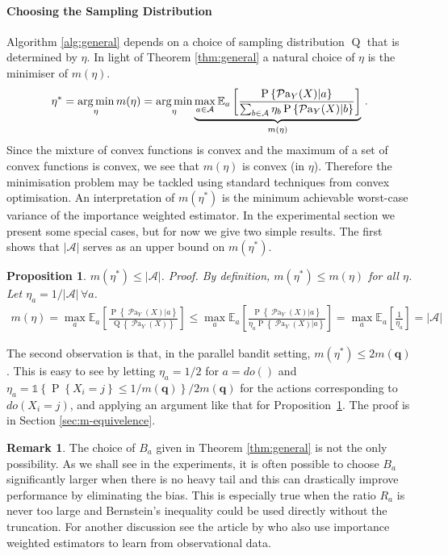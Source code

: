 \documentclass{article}
\newif\ifsup\suptrue
\newcommand{\set}[1]{\left\{#1\right\}}
\newcommand{\ind}[1]{\mathds{1}\!\!\set{#1}}
\newcommand{\argmin}{\operatornamewithlimits{arg\,min}}
\newcommand{\eq}[1]{\begin{align*}#1\end{align*}}
\renewcommand{\P}[1]{\operatorname{P}\left\{#1\right\}}
\newcommand{\Q}[1]{\operatorname{Q}\left\{#1\right\}}
\newcommand{\EE}{\mathbb E}
\newcommand{\EEa}{\EE_a}
\newcommand{\Pn}[2]{\operatorname{P}\left\{#2|#1\right\}}
\newcommand{\parents}[1]{\operatorname{\mathcal{P}a}_{#1}}
\newcommand{\calA}{\mathcal A}
\theoremstyle{plain}
\newtheorem{proposition}[theorem]{Proposition}
\theoremstyle{definition}
\newtheorem{remark}[theorem]{Remark}
\begin{document}
\paragraph{Choosing the Sampling Distribution} Algorithm \ref{alg:general} depends on a choice of sampling distribution $\operatorname{Q}$ that is determined by $\eta$. In light of Theorem \ref{thm:general}
a natural choice of $\eta$ is the minimiser of $m(\eta)$.
\eq{
\eta^* 
= \argmin_\eta m(\eta) = \argmin_\eta \underbrace{\max_{a \in \calA} \EEa \left[\frac{\Pn{a}{\parents{Y}(X)}}{\sum_{b \in \calA} \eta_b \Pn{b}{\parents{Y}(X)}}\right]}_{m(\eta)}\,.
}
Since the mixture of convex functions is convex and the maximum of a set of convex functions is convex, we see that $m(\eta)$ is convex (in $\eta$).
Therefore the minimisation problem may be tackled using standard techniques from convex optimisation. An interpretation of $m(\eta^*)$ is the minimum achievable worst-case variance of the importance weighted estimator. In the experimental section we present some special cases, but for now we give two simple results. The first shows that $|\calA|$ serves as an upper bound on $m(\eta^*)$.

\begin{proposition}\label{pro:m-bound}
$m(\eta^*) \leq |\calA|$. \textit{Proof.} 
\textup{By definition, $m(\eta^*) \leq m(\eta)$ for all $\eta$. Let $\eta_a = 1/|\calA|\,\forall a$.}
\eq{
m(\eta) 
= \max_a \EEa\left[\frac{\Pn{a}{\parents{Y}(X)}}{\Q{\parents{Y}(X)}}\right] 
\leq \max_a \EEa\left[\frac{\Pn{a}{\parents{Y}(X)}}{\eta_a \Pn{a}{\parents{Y}(X)}}\right] 
= \max_a \EEa\left[\frac{1}{\eta_a}\right] = |\calA| %
}
\end{proposition} 

The second observation is that, in the parallel bandit setting, $m(\eta^*) \leq 2m(\boldsymbol{q})$. This is easy to see by letting $\eta_a = 1/2$ for $a = do()$ and $\eta_a = \ind{\P{X_i = j} \leq 1/m(\boldsymbol{q})} / 2m(\boldsymbol{q})$ for the actions corresponding to $do(X_i=j)$, and applying an argument like that for Proposition~\ref{pro:m-bound}. \ifsup 
The proof is in Section \ref{sec:m-equivelence}.
\else
The proof is in the supplementary materials.
\fi

\begin{remark}\label{rem:truncate}
The choice of $B_a$ given in Theorem \ref{thm:general} is not the only possibility. As we shall see in the experiments, it is 
often possible to choose $B_a$ significantly
larger when there is no heavy tail and this can drastically improve performance by eliminating the bias. This is especially true when the ratio $R_a$ is never too large
and Bernstein's inequality could be used directly without the truncation. For another discussion see the article by \citet{BJQ13} who also use importance weighted estimators
to learn from observational data.
\end{remark}
\end{document}
